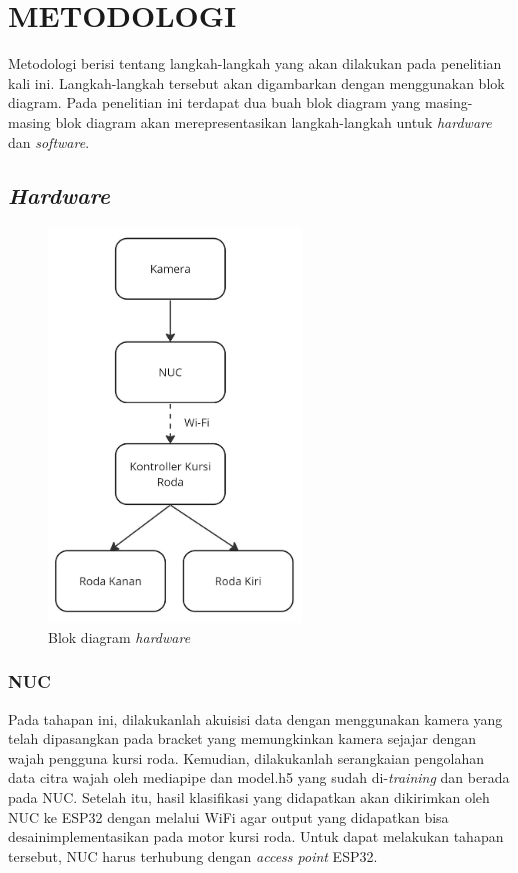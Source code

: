 \chapter{METODOLOGI}
\label{chap:desainimplementasi}


Metodologi berisi tentang langkah-langkah yang akan dilakukan pada penelitian kali ini. Langkah-langkah tersebut akan digambarkan dengan menggunakan blok diagram. Pada penelitian ini terdapat dua buah blok diagram yang masing-masing blok diagram akan merepresentasikan langkah-langkah untuk \emph{hardware} dan \emph{software}.

\section{\emph{Hardware}}

\begin{figure} [H] \centering
  \includegraphics[width=0.6\textwidth]{gambar/blokdiagramidfix.jpg}
  \caption{Blok diagram \emph{hardware}}
  \label{fig:Blok Diagram}
\end{figure}

\subsection{NUC}
Pada tahapan ini, dilakukanlah akuisisi data dengan menggunakan kamera yang telah dipasangkan pada bracket yang memungkinkan kamera sejajar dengan wajah pengguna kursi roda. Kemudian, dilakukanlah serangkaian pengolahan data citra wajah oleh mediapipe dan model.h5 yang sudah di-\emph{training} dan berada pada NUC. Setelah itu, hasil klasifikasi yang didapatkan akan dikirimkan oleh NUC ke ESP32 dengan melalui WiFi agar output yang didapatkan bisa desainimplementasikan pada motor kursi roda. Untuk dapat melakukan tahapan tersebut, NUC harus terhubung dengan \emph{access point} ESP32.


